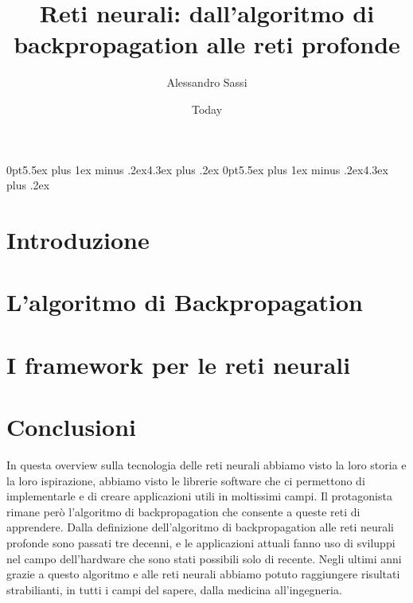 \documentclass [12pt,oneside,a4paper,openany]{book}
\begin{document}
\title{Reti neurali: dall'algoritmo di backpropagation alle reti profonde }
\author{Alessandro Sassi}
\date{Today}

\titlespacing*{\section}
{0pt}{5.5ex plus 1ex minus .2ex}{4.3ex plus .2ex}
\titlespacing*{\subsection}
{0pt}{5.5ex plus 1ex minus .2ex}{4.3ex plus .2ex}






\tableofcontents
{}
\chapter{Introduzione}

\chapter{L'algoritmo di Backpropagation }

\chapter{I framework per le reti neurali}


\chapter{Conclusioni}
In questa overview sulla tecnologia delle reti neurali abbiamo visto la loro storia e la loro ispirazione, abbiamo visto le librerie software che ci permettono di implementarle e di creare applicazioni utili in moltissimi campi. Il protagonista rimane però l'algoritmo di backpropagation che consente a queste reti di apprendere. Dalla definizione dell'algoritmo di backpropagation alle reti neurali profonde sono passati tre decenni, e le applicazioni attuali fanno uso di sviluppi nel campo dell'hardware che sono stati possibili solo di recente. Negli ultimi anni grazie a questo algoritmo e alle reti neurali abbiamo potuto raggiungere risultati strabilianti, in tutti i campi del sapere, dalla medicina all'ingegneria.
\end{document}
